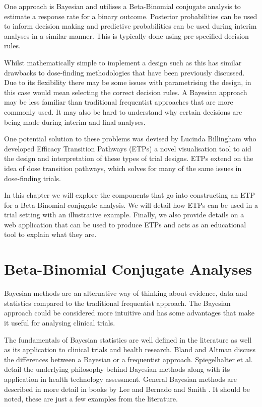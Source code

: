 One approach is Bayesian and utilises a Beta-Binomial conjugate analysis to estimate a  response rate for a binary outcome. Posterior probabilities can be used to inform decision making and predictive probabilities can be used during interim analyses in a similar manner. This is typically done using pre-specified decision rules.

Whilst mathematically simple to implement a design such as this has similar drawbacks to dose-finding methodologies that have been previously discussed. Due to its flexibility there may be some issues with parametrising the design, in this case would mean selecting the correct decision rules. A Bayesian approach may be less familiar than traditional frequentist approaches that are more commonly used. It may also be hard to understand why certain decisions are being made during interim and final analyses.  

One potential solution to these problems was devised by Lucinda Billingham who developed Efficacy Transition Pathways (ETPs) a novel visualisation tool to aid the design and interpretation of these types of trial designs. ETPs extend on the idea of dose transition pathways, which solves for many of the same issues in dose-finding trials. 

In this chapter we will explore the components that go into constructing an ETP for a Beta-Binomial conjugate analysis. We will detail how ETPs can be used in a trial setting with an illustrative example. Finally, we also provide details on a web application that can be used to produce ETPs and acts as an educational tool to explain what they are. 


\section{Beta-Binomial Conjugate Analyses}
\label{etp:BBConjugateAnalysis}

Bayesian methods are an alternative way of thinking about evidence, data and statistics compared to the traditional frequentist approach. The Bayesian approach could be considered more intuitive and has some advantages that make it useful for analysing clinical trials. 

The fundamentals of Bayesian statistics are well defined in the literature as well as its application to clinical trials and health research. Bland and Altman \cite{blandBayesiansFrequentists1998} discuss the differences between a Bayesian or a frequentist approach. Spiegelhalter et al. \cite{spiegelhalterIntroductionBayesianMethods1999} detail the underlying philosophy behind Bayesian methods along with its application in health technology assessment. General Bayesian methods are described in more detail in books by Lee \cite{leeBayesianStatisticsIntroduction2012} and Bernado and Smith \cite{bernardoBayesianTheory2009}. It should be noted, these are just a few examples from the literature.    

